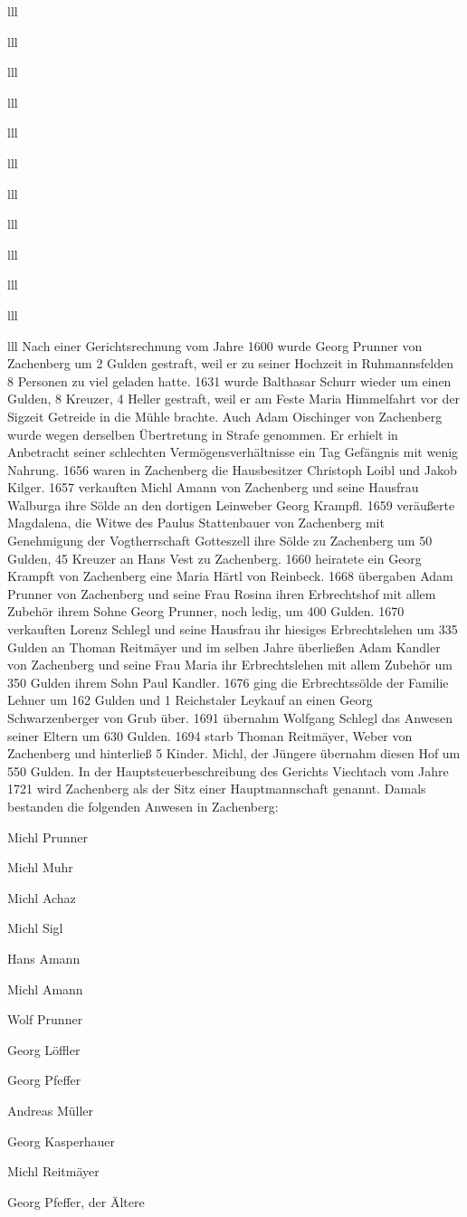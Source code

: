 \documentclass[12pt,a4pager]{book}
\begin{document}
\begin{tabuluar}{lll}
\begin{tabuluar}{lll}
\begin{tabuluar}{lll}
\begin{tabuluar}{lll}
\begin{tabuluar}{lll}
\begin{tabuluar}{lll}
\begin{tabuluar}{lll}
\begin{tabuluar}{lll}
\begin{tabuluar}{lll}
\begin{tabuluar}{lll}
\begin{tabuluar}{lll}
\begin{tabuluar}{lll}
Nach einer Gerichtsrechnung vom Jahre 1600 wurde Georg Prunner von Zachenberg um
2 Gulden gestraft, weil er zu seiner Hochzeit in Ruhmannsfelden 8 Personen zu
viel geladen hatte. 1631 wurde Balthasar Schurr wieder um einen Gulden, 8
Kreuzer, 4 Heller gestraft, weil er am Feste Maria Himmelfahrt vor der Sigzeit
Getreide in die Mühle brachte. Auch Adam Oischinger von Zachenberg wurde wegen
derselben Übertretung in Strafe genommen. Er erhielt in Anbetracht seiner
schlechten Vermögensverhältnisse ein Tag Gefängnis mit wenig Nahrung. 1656 waren
in Zachenberg die Hausbesitzer Christoph Loibl und Jakob Kilger. 1657 verkauften
Michl Amann von Zachenberg und seine Hausfrau Walburga ihre Sölde an den
dortigen Leinweber Georg Krampfl. 1659 veräußerte Magdalena, die Witwe des
Paulus Stattenbauer von Zachenberg mit Genehmigung der Vogtherrschaft Gotteszell
ihre Sölde zu Zachenberg um 50 Gulden, 45 Kreuzer an Hans Vest zu Zachenberg.
1660 heiratete ein Georg Krampft von Zachenberg eine Maria Härtl von Reinbeck.
1668 übergaben Adam Prunner von Zachenberg und seine Frau Rosina ihren
Erbrechtshof mit allem Zubehör ihrem Sohne Georg Prunner, noch ledig, um 400
Gulden. 1670 verkauften Lorenz Schlegl und seine Hausfrau ihr hiesiges
Erbrechtslehen um 335 Gulden an Thoman Reitmäyer und im selben Jahre überließen
Adam Kandler von Zachenberg und seine Frau Maria ihr Erbrechtslehen mit allem
Zubehör um 350 Gulden ihrem Sohn Paul Kandler. 1676 ging die Erbrechtssölde der
Familie Lehner um 162 Gulden und 1 Reichstaler Leykauf an einen Georg
Schwarzenberger von Grub über. 1691 übernahm Wolfgang Schlegl das Anwesen seiner
Eltern um 630 Gulden. 1694 starb Thoman Reitmäyer, Weber von Zachenberg und
hinterließ 5 Kinder. Michl, der Jüngere übernahm diesen Hof um 550 Gulden. In
der Hauptsteuerbeschreibung des Gerichts Viechtach vom Jahre 1721 wird
Zachenberg als der Sitz einer Hauptmannschaft genannt. Damals bestanden die
folgenden Anwesen in Zachenberg:

\begin{compactitem}
\item Michl Prunner
\item Michl Muhr
\item Michl Achaz
\item Michl Sigl
\item Hans Amann
\item Michl Amann
\item Wolf Prunner
\item Georg Löffler
\item Georg Pfeffer
\item Andreas Müller
\item Georg Kasperhauer
\item Michl Reitmäyer
\item Georg Pfeffer, der Ältere
\end{compactitem}


\end{tabuluar}
\end{tabuluar}
\end{tabuluar}
\end{tabuluar}
\end{tabuluar}
\end{tabuluar}
\end{tabuluar}
\end{tabuluar}
\end{tabuluar}
\end{tabuluar}
\end{tabuluar}
\end{tabuluar}
\end{document}
